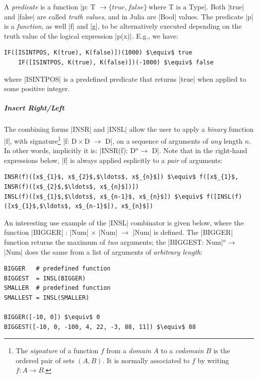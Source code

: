 A \emph{predicate} is a
function |p: T $\to \{true,
false\}\ \mbox{where}$ T $\mbox{is a}$ Type|.  Both
|true| and |false| are called \emph{truth values}, and
in Julia are |Bool| values. The predicate |p| is a \emph{function}, as well |f| and |g|,
to be alternatively executed depending on the truth value of the logical
expression |p(x)|.  E.g., we have:
\begin{lstlisting}[language=JuliaLocal, style=julia, mathescape = true]
    IF([ISINTPOS, K(true), K(false)])(1000) $\equiv$ true
    IF([ISINTPOS, K(true), K(false)])(-1000) $\equiv$ false
\end{lstlisting}
where |ISINTPOS| is a predefined predicate that returns |true| 
when applied to some positive integer. 


\subparagraph{Insert Right/Left}
The combining forms |INSR| and |INSL| allow the user to apply
a \emph{binary} function |f|, with signature\footnote{The \emph{signature}
of a function $f$ from a \emph{domain} $A$ to a \emph{codomain} $B$ is
the ordered pair of sets $(A,B)$.  It is normally associated to $f$ by
writing $f : A \rightarrow B$.} |f: D${}\times{}$D $\to$ D|, on a sequence
of arguments of \emph{any} length $n$. In other words, implicitly it is: |INSR(f): D$^n\to$ D|. Note that in the right-hand 
expressions below, |f| is always applied esplicitly  to a \emph{pair} of arguments:
\begin{lstlisting}[language=JuliaLocal, style=julia, mathescape = true] 
INSR(f)([x$_{1}$, x$_{2}$,$\ldots$, x$_{n}$]) $\equiv$ f([x$_{1}$, INSR(f)([x$_{2}$,$\ldots$, x$_{n}$])]) 
INSL(f)([x$_{1}$,$\ldots$, x$_{n-1}$, x$_{n}$]) $\equiv$ f([INSL(f)([x$_{1}$,$\ldots$, x$_{n-1}$]), x$_{n}$])
\end{lstlisting}

An interesting use example of the |INSL| combinator is given
below, where the function |BIGGER| : |Num| $\times$
|Num| $\to$ |Num| is defined.  The
|BIGGER| function returns the maximum of \emph{two} arguments; 
the |BIGGEST: Num|$^n \to$ |Num|  does the same from a list
of arguments of \emph{arbitrary length}:
\begin{lstlisting}[language=JuliaLocal, style=julia, mathescape = true] 
BIGGER   # predefined function
BIGGEST  = INSL(BIGGER)
SMALLER  # predefined function
SMALLEST = INSL(SMALLER)

BIGGER([-10, 0]) $\equiv$ 0 
BIGGEST([-10, 0, -100, 4, 22, -3, 88, 11]) $\equiv$ 88
\end{lstlisting}



